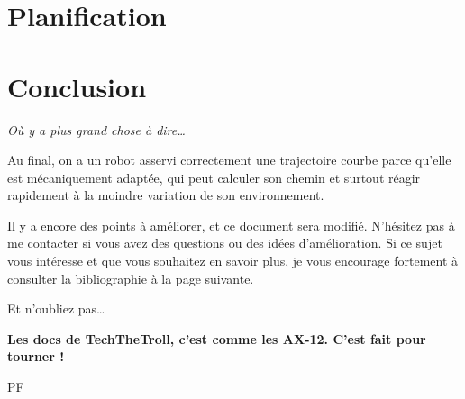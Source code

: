 \documentclass[11pt]{article}
\begin{document}
    \section{Planification}\label{sec:planification}






    \section{Conclusion}

    \hfill \textit{Où y a plus grand chose à dire…}

    \vspace{10pt}

    Au final, on a un robot asservi correctement une trajectoire courbe parce qu'elle est mécaniquement adaptée, qui peut calculer son chemin et surtout réagir rapidement à la moindre variation de son environnement.

    Il y a encore des points à améliorer, et ce document sera modifié. N'hésitez pas à me contacter si vous avez des questions ou des idées d'amélioration. Si ce sujet vous intéresse et que vous souhaitez en savoir plus, je vous encourage fortement à consulter la bibliographie à la page suivante.

    Et n'oubliez pas…

    \begin{center}
        \textbf{Les docs de TechTheTroll, c'est comme les AX-12. C'est fait pour tourner !}
    \end{center}

    \hfill PF



    \newpage
    
    
\end{document}
